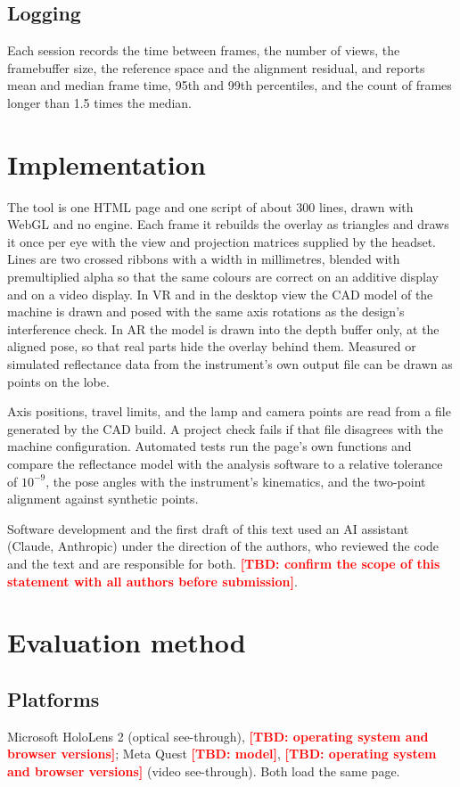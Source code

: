 \documentclass[11pt]{article}
\newcommand{\tbd}[1]{\textcolor{red}{\textbf{[TBD: #1]}}}
\begin{document}
\subsection{Logging}
Each session records the time between frames, the number of views, the framebuffer size, the reference space and the
alignment residual, and reports mean and median frame time, 95th and 99th percentiles, and the count of frames longer
than 1.5 times the median.

\section{Implementation}
The tool is one HTML page and one script of about 300 lines, drawn with WebGL and no engine. Each frame it rebuilds
the overlay as triangles and draws it once per eye with the view and projection matrices supplied by the headset. Lines
are two crossed ribbons with a width in millimetres, blended with premultiplied alpha so that the same colours are
correct on an additive display and on a video display. In VR and in the desktop view the CAD model of the machine is
drawn and posed with the same axis rotations as the design's interference check. In AR the model is drawn into the
depth buffer only, at the aligned pose, so that real parts hide the overlay behind them. Measured or simulated
reflectance data from the instrument's own output file can be drawn as points on the lobe.

Axis positions, travel limits, and the lamp and camera points are read from a file generated by the CAD build. A
project check fails if that file disagrees with the machine configuration. Automated tests run the page's own
functions and compare the reflectance model with the analysis software to a relative tolerance of $10^{-9}$, the pose
angles with the instrument's kinematics, and the two-point alignment against synthetic points.

Software development and the first draft of this text used an AI assistant (Claude, Anthropic) under the direction of
the authors, who reviewed the code and the text and are responsible for both. \tbd{confirm the scope of this statement
with all authors before submission}.

\section{Evaluation method}
\subsection{Platforms}
Microsoft HoloLens 2 (optical see-through), \tbd{operating system and browser versions}; Meta Quest \tbd{model},
\tbd{operating system and browser versions} (video see-through). Both load the same page.
\end{document}
